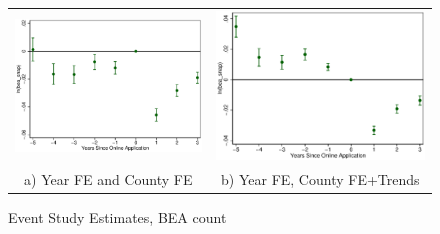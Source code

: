 \documentclass[11pt,letterpaper]{article}
\begin{document}
\begin{figure}\caption{Event Study Estimates, BEA count}
\begin{tabular}{cc}
\includegraphics[scale=0.57]{tabfig/evstu_bea_snap_one_yrcf_5_3}&\includegraphics[scale=0.57]{tabfig/evstu_bea_snap_one_yrcfsttr_5_3}\\
a) Year FE and County FE&b) Year FE, County FE+Trends\\

\end{tabular}
\end{figure}
\end{document}
